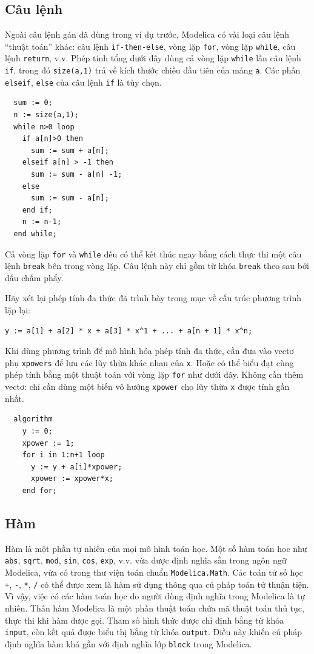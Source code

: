\subsection{Câu lệnh}
Ngoài câu lệnh gán đã dùng trong ví dụ trước, Modelica có vài loại câu lệnh ``thuật toán'' khác: câu lệnh \texttt{if-then-else}, vòng lặp \texttt{for}, vòng lặp \texttt{while}, câu lệnh \texttt{return}, v.v. Phép tính tổng dưới đây dùng cả vòng lặp \texttt{while} lẫn câu lệnh \texttt{if}, trong đó \texttt{size(a,1)} trả về kích thước chiều đầu tiên của mảng \texttt{a}. Các phần \texttt{elseif}, \texttt{else} của câu lệnh \texttt{if} là tùy chọn.
\begin{verbatim}
  sum := 0;
  n := size(a,1);
  while n>0 loop
    if a[n]>0 then
      sum := sum + a[n];
    elseif a[n] > -1 then
      sum := sum - a[n] -1;
    else
      sum := sum - a[n];
    end if;
    n := n-1;
  end while;
\end{verbatim}
Cả vòng lặp \texttt{for} và \texttt{while} đều có thể kết thúc ngay bằng cách thực thi một câu lệnh \texttt{break} bên trong vòng lặp. Câu lệnh này chỉ gồm từ khóa \texttt{break} theo sau bởi dấu chấm phẩy.

Hãy xét lại phép tính đa thức đã trình bày trong mục về cấu trúc phương trình lặp lại:
\begin{verbatim}
y := a[1] + a[2] * x + a[3] * x^1 + ... + a[n + 1] * x^n;
\end{verbatim}
Khi dùng phương trình để mô hình hóa phép tính đa thức, cần đưa vào vectơ phụ \texttt{xpowers} để lưu các lũy thừa khác nhau của \texttt{x}. Hoặc có thể biểu đạt cùng phép tính bằng một thuật toán với vòng lặp \texttt{for} như dưới đây. Không cần thêm vectơ: chỉ cần dùng một biến vô hướng \texttt{xpower} cho lũy thừa \texttt{x} được tính gần nhất.
\begin{verbatim}
  algorithm
    y := 0;
    xpower := 1;
    for i in 1:n+1 loop
      y := y + a[i]*xpower;
      xpower := xpower*x;
    end for;
\end{verbatim}

\subsection{Hàm}
Hàm là một phần tự nhiên của mọi mô hình toán học. Một số hàm toán học như \texttt{abs}, \texttt{sqrt}, \texttt{mod}, \texttt{sin}, \texttt{cos}, \texttt{exp}, v.v. vừa được định nghĩa sẵn trong ngôn ngữ Modelica, vừa có trong thư viện toán chuẩn \texttt{Modelica.Math}. Các toán tử số học \texttt{+}, \texttt{-}, \texttt{*}, \texttt{/} có thể được xem là hàm sử dụng thông qua cú pháp toán tử thuận tiện. Vì vậy, việc có các hàm toán học do người dùng định nghĩa trong Modelica là tự nhiên. Thân hàm Modelica là một phần thuật toán chứa mã thuật toán thủ tục, thực thi khi hàm được gọi. Tham số hình thức được chỉ định bằng từ khóa \texttt{input}, còn kết quả được biểu thị bằng từ khóa \texttt{output}. Điều này khiến cú pháp định nghĩa hàm khá gần với định nghĩa lớp \texttt{block} trong Modelica.

